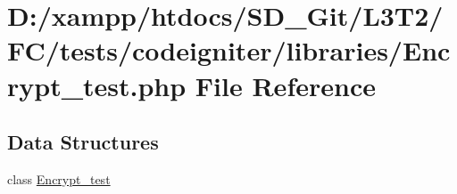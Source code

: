 \hypertarget{tests_2codeigniter_2libraries_2_encrypt__test_8php}{}\section{D\+:/xampp/htdocs/\+S\+D\+\_\+\+Git/\+L3\+T2/\+F\+C/tests/codeigniter/libraries/\+Encrypt\+\_\+test.php File Reference}
\label{tests_2codeigniter_2libraries_2_encrypt__test_8php}
\subsection*{Data Structures}
\begin{DoxyCompactItemize}
\item 
class \hyperlink{class_encrypt__test}{Encrypt\+\_\+test}
\end{DoxyCompactItemize}
